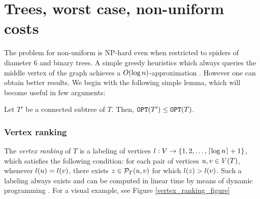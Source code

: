\newpage
\section{Trees, worst case, non-uniform costs}

The problem for non-uniform is NP-hard even when restricted to spiders of diameter $6$ and binary trees.
A simple greedy heuristics which always queries the middle vertex of the graph achieves a $O\mathopen{}\left( \log n \right)$-approximation \cite{Dereniowski2009ERankOfWTs}. However one can obtain better results. 
We begin with the following simple lemma, which will become useful in few arguments:
\begin{lemma}\label{lemma:subtreeCost}
    Let $T'$ be a connected subtree of $T$. Then, $\texttt{OPT}\mathopen{}\left( T' \right)\leq\texttt{OPT}\mathopen{}\left( T \right)$.
\end{lemma}

\subsubsection{Vertex ranking}\label{vertexRanking}
The \textit{vertex ranking} of $T$ is a labeling of vertices $l:V\to \mathopen{}\left\{ 1,2,\dots,\mathopen{}\left\lceil \log n \right\rceil+1 \right\}$, which satisfies the following condition: for each pair of vertices $u,v\in V\mathopen{}\left( T \right)$, whenever $l\mathopen{}\left( u \right)=l\mathopen{}\left( v \right)$, there exists $z\in \mathcal{P}_T\mathopen{}\left( u,v \right)$ for which $l\mathopen{}\left( z \right)>l\mathopen{}\left( v \right)$. Such a labeling always exists and can be computed in linear time by means of dynamic programming \cite{Schaffer1989OptNodeRankOfTsInLinTime, OnakParys2006GenOfBSSInTsAndFLikePosets, Mozes_Onak2008FindOptTSStartInLinTime}. For a visual example, see Figure \ref{vertex_ranking_figure}


